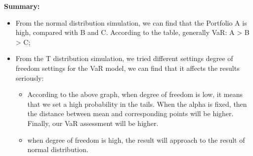 \documentclass[a4paper,12pt]{article}
\begin{document}
\textbf{Summary:}
\begin{itemize}
    \item From the normal distribution simulation, we can find that the Portfolio A is high, compared with B and C. According to the table, generally VaR: A > B > C;
    \item From the T distribution simulation, we tried different settings degree of freedom settings for the VaR model, we can find that it affects the results seriously:
    \begin{itemize}
        \item According to the above graph, when degree of freedom is low, it means that we set a high probability in the tails. When the alpha is fixed, then the distance between mean and corresponding points will be higher. Finally, our VaR assessment will be higher.
        \item when degree of freedom is high, the result will approach to the result of normal distribution.
    \end{itemize}
\end{itemize}
\end{document}
